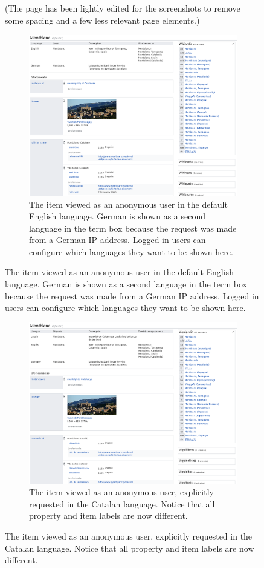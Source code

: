 \begin{figure}
{    (The page has been lightly edited for the screenshots
    to remove some spacing and a few less relevant page elements.)
  }
  \label{fig:montblanc}
  \begin{subfigure}{\textwidth}
    \caption[The item viewed as an anonymous user in the default English language.]{
      The item viewed as an anonymous user in the default English language.
      German is shown as a second language in the term box
      because the request was made from a German IP address.
      Logged in users can configure which languages they want to be shown here.
    }
    \label{fig:montblanc-en}
    \includegraphics[width=\textwidth]{screenshots/montblanc-en}
  \end{subfigure}
\end{figure}
\begin{figure}\ContinuedFloat
  \begin{subfigure}{\textwidth}
    \caption[The item viewed as an anonymous user, explicitly requested in the Catalan language.]{
      The item viewed as an anonymous user, explicitly requested in the Catalan language.
      Notice that all property and item labels are now different.
    }
    \label{fig:montblanc-ca}
    \includegraphics[width=\textwidth]{screenshots/montblanc-ca}
  \end{subfigure}
\end{figure}

